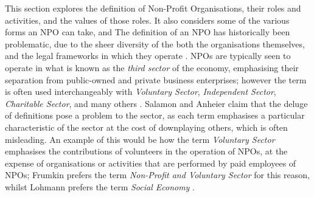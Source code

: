 
This section explores the definition of Non-Profit Organisations, their roles and activities, and the values of those roles. It also considers some of the various forms an NPO can take, and 
%
The definition of an NPO has historically been problematic, due to the sheer diversity of the both the organisations themselves, and the legal frameworks in which they operate \cite{salamon_search_1992}. NPOs are typically seen to operate in what is known as the \textit{third sector} of the economy, emphasising their separation from public-owned and private business enterprises; however the term is often used interchangeably with \textit{Voluntary Sector}, \textit{Independent Sector}, \textit{Charitable Sector}, and many others \cite{evers_third_2004, salamon_search_1992}. Salamon and Anheier claim that the deluge of definitions pose a problem to the sector, as each term emphasises a particular characteristic of the sector at the cost of downplaying others, which is often misleading. An example of this would be how the term \textit{Voluntary Sector} emphasises the contributions of volunteers in the operation of NPOs, at the expense of organisations or activities that are performed by paid employees of NPOs; Frumkin prefers the term \textit{Non-Profit and Voluntary Sector} for this reason, whilst Lohmann prefers the term \textit{Social Economy} \cite{frumkin_being_2009, salamon_search_1992, lohmann_charity_2007}.
%
